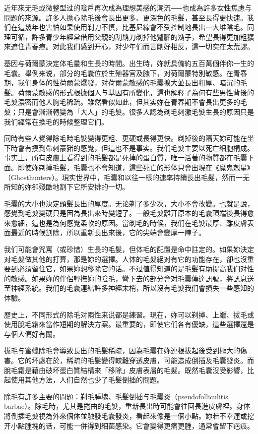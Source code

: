 \documentclass[12pt,UTF8]{ctexbook}
\begin{document}
近年來无毛或微整型过的陰戶再次成為理想美感的潮流⸺也成為許多女性焦慮与問題的來源。許多人擔心除毛後會長出更多、更深色的毛髮，甚至長得更快速。我们在這幾年也害怕如果使用剃刀不慎，比基尼線會不受控制地長出一大堆陰毛。同理可循，許多青少年經常借用父親的刮鬍刀剃掉他蹩腳的鬍子，希望長得更加粗獷來遮住青春痘。对此我们感到开心，对少年们而言剛好相反，這一切实在太荒謬。

基因与荷爾蒙決定体毛量和生長的時間。出生時，妳就具備約五百萬個伴你一生的毛囊。舉例来说，部分的毛囊位於生殖器官及腋下，对荷爾蒙特別敏感。在青春期，我们身体的性荷爾蒙爆發，对荷爾蒙敏感的毛囊擴大並長出粗厚、暗沉的毛髮。荷爾蒙敏感的形式根據個人与基因有所變化，這也解釋了為何有些男性背後的毛髮濃密而他人胸毛稀疏。雖然看似如此，但其实妳在青春期不會長出更多的毛髮；只是會漸漸轉變為「大人」的毛髮。很多人認為剃毛刺激毛髮生長的原因只是我们經常在換毛的時候整理它们。

同時有些人覺得除毛時毛髮變得更粗、更硬或長得更快。剃掉後的隔天妳可能在坐下時會有摸到帶刺豪豬的感覺，但這也不是事实。我们毛髮主要以死亡細胞構成。事实上，所有皮膚上看得到的毛髮都是死掉的蛋白質，唯一活著的物質都在毛囊下面。即使妳剃掉毛髮，毛囊也不會知道，這些死亡的形体只會出現在《魔鬼剋星》（Ghosthunters）。現实世界中，毛囊和以往一樣的速率持續長出毛髮，然而一无所知的妳卻殘酷地割下它所安排的一切。

毛囊的大小也決定頭髮長出的厚度。无论剃了多少次，大小不會改變。也就是說，感覺到毛髮變硬只是因為長出來時變短了。一般毛髮離开原本的毛囊頂端後長得愈來愈細，這也是為何感覺柔軟的原因。當剃毛的時候，我们在毛髮最厚、離皮膚表面最近的時候割除，所以重新長出來後，它的尖端會變厚一陣子。

我们可能會咒罵（或珍惜）生長的毛髮，但体毛的配置是命中註定的。如果妳決定对毛髮做其他的打算，那是妳的選擇。人体的毛髮絕对有它的功能存在，卻也沒重要到必須留住它，如果妳想移除它的话。不过值得知道的是毛髮有助提高我们对性的敏感。如果妳的伴侶輕撫妳的陰毛，彎下去的部分會对毛囊傳達訊號，將訊息送至神經系統。我们的毛囊連結許多神經末梢，所以沒有毛髮我们會損失一些感知的体驗。

歷史上，不同形式的除毛对兩性来说都是練習。現在，妳可以剃掉、上蠟、拔毛或使用脫毛霜來當作短期的解決方案。最重要的，即使它们各有優缺，這些選擇還是与個人偏好有關。

拔毛与蜜蠟除毛會導致長出的毛髮稀疏，因為毛囊在妳連根拔起後受到極大的傷害。它的坏處在於，稀疏的毛髮變得較難穿透皮膚，可能造成倒插及毛囊發炎。而脫毛霜是藉由破坏蛋白質結構來「移除」皮膚表層的毛髮。既然毛囊沒受影響，比起使用其他方法，人们自然也少了毛髮倒插的問題。

除毛有許多主要的問題：剃毛腫塊、毛髮倒插与毛囊炎（pseudofolliculitis barbae）。除毛時，尤其是捲曲的毛髮，重新長出時可能會往回長進皮膚裡。身体將倒插毛髮視為外來個体並触發毛囊發炎，看起來像是一個小點。妳若不幸運或挖开小點腫塊的话，可能一併得到細菌感染。它會變得更痛更腫，通常會留下疤痕。
\end{document}
